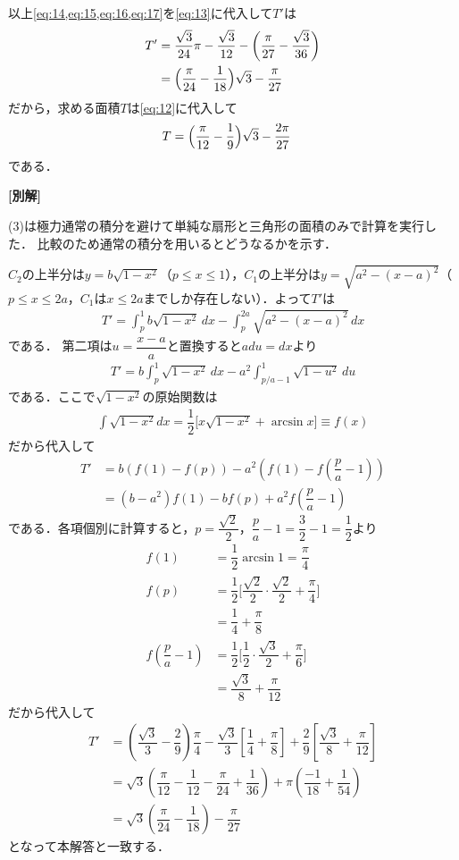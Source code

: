 \documentclass[../../main.tex]{subfiles}
\begin{document}
以上\cref{eq:14,eq:15,eq:16,eq:17}を\cref{eq:13}に代入して$T'$は
\begin{align}
  T'
  &= \dfrac{\sqrt{3}}{24}\pi - \dfrac{\sqrt{3}}{12} - \left(\dfrac{\pi}{27} - \dfrac{\sqrt{3}}{36} \right) \\
  &= \Bigl(\dfrac{\pi}{24}-\dfrac{1}{18}\Bigr)\sqrt{3}-\dfrac{\pi}{27}
\end{align}
だから，求める面積$T$は\cref{eq:12}に代入して
\begin{align}
  T
  &= \Bigl(\dfrac{\pi}{12}-\dfrac{1}{9}\Bigr)\sqrt{3}-\dfrac{2\pi}{27}
\end{align}
である．

{\bf [別解]}

(3)は極力通常の積分を避けて単純な扇形と三角形の面積のみで計算を実行した．
比較のため通常の積分を用いるとどうなるかを示す．

$C_2$の上半分は$y=b\sqrt{1-x^2}$（$p\le x\le1$），$C_1$の上半分は$y=\sqrt{a^2-(x-a)^2}$（$p\le x\le2a$，$C_1$は$x\le2a$までしか存在しない）．よって$T'$は
\begin{align}
  T'=\int_p^1b\sqrt{1-x^2}\,dx-\int_p^{2a}\sqrt{a^2-(x-a)^2}\,dx
\end{align}
である．
第二項は$u=\dfrac{x-a}{a}$と置換すると$a du = dx$より
\begin{align}
  T'=b \int_p^1\sqrt{1-x^2}\,dx-a^2 \int_{p/a-1}^{1}\sqrt{1-u^2}\,du
\end{align}
である．ここで$\sqrt{1-x^2}$の原始関数は
\begin{align}
  \int\sqrt{1-x^2}dx=\dfrac{1}{2}\bigl[x\sqrt{1-x^2}+\arcsin x\bigr] \equiv f(x)
\end{align}
だから代入して
\begin{align}
  T'
  &= b\left(f(1) - f(p)\right) - a^2 \left(f(1)-f\left(\dfrac{p}{a}-1\right)\right) \\
  &= (b-a^2)f(1) -bf(p) + a^2f\left(\dfrac{p}{a}-1\right)
\end{align}
である．各項個別に計算すると，$p=\dfrac{\sqrt{2}}{2}$，$\dfrac{p}{a}-1 = \dfrac{3}{2}-1 = \dfrac{1}{2}$より
\begin{align}
  f(1) &= \dfrac{1}{2}\arcsin 1 = \dfrac{\pi}{4} \\
  f(p) &= \dfrac{1}{2}\bigl[\dfrac{\sqrt{2}}{2}\cdot\dfrac{\sqrt{2}}{2}+\dfrac{\pi}{4}\bigr]  \\
  &=\dfrac{1}{4}+\dfrac{\pi}{8} \\
  f\left(\dfrac{p}{a}-1\right)
  &= \dfrac{1}{2}\bigl[\dfrac{1}{2}\cdot\dfrac{\sqrt{3}}{2}+\dfrac{\pi}{6}\bigr] \\
  &= \dfrac{\sqrt{3}}{8} + \dfrac{\pi}{12}
\end{align}
だから代入して
\begin{align}
  T'
  &= \left(\dfrac{\sqrt{3}}{3} - \dfrac{2}{9}\right) \dfrac{\pi}{4} - \dfrac{\sqrt{3}}{3}\left[\dfrac{1}{4}+\dfrac{\pi}{8}\right] + \dfrac{2}{9}\left[\dfrac{\sqrt{3}}{8} + \dfrac{\pi}{12}\right] \\
  &= \sqrt{3}\left(\dfrac{\pi}{12}-\dfrac{1}{12} - \dfrac{\pi}{24} + \dfrac{1}{36}\right) + \pi\left(\dfrac{-1}{18}+\dfrac{1}{54}\right) \\
  &= \sqrt{3}\left(\dfrac{\pi}{24} - \dfrac{1}{18}\right) - \dfrac{\pi}{27}
\end{align}
となって本解答と一致する．
\end{document}
